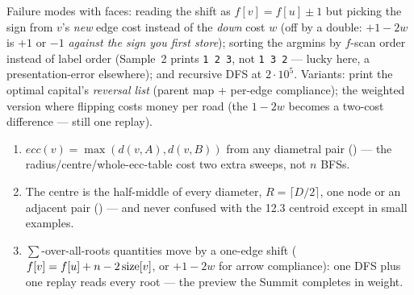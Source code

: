 
\begin{warningbox}
Failure modes with faces: reading the shift as $f[v] = f[u] \pm 1$ but picking the sign
from $v$'s \emph{new} edge cost instead of the \emph{down} cost $w$ (off by a
double: $+1-2w$ is $+1$ or $-1$ \emph{against the sign you first store}); sorting the
argmins by $f$-scan order instead of label order (Sample~2 prints \texttt{1 2 3}, not
\texttt{1 3 2} --- lucky here, a presentation-error elsewhere); and recursive DFS at
$2\cdot 10^5$. Variants: print the optimal capital's \emph{reversal list} (parent map
+ per-edge compliance); the weighted version where flipping costs money per road
(the $1-2w$ becomes a two-cost difference --- still one replay).
\end{warningbox}

\begin{insightbox}
\begin{enumerate}[nosep, leftmargin=1.6em]
  \item $\mathit{ecc}(v) = \max(d(v,A), d(v,B))$ from any diametral pair
        () --- the radius/centre/whole-ecc-table cost two extra
        sweeps, not $n$ BFSs.
  \item The centre is the half-middle of every diameter, $R = \lceil D/2 \rceil$, one
        node or an adjacent pair () --- and never confused with
        the 12.3 centroid except in small examples.
  \item $\sum$-over-all-roots quantities move by a one-edge shift
        ($f[v] = f[u] + n - 2\operatorname{size}[v]$, or $+1-2w$ for arrow compliance): one DFS plus
        one replay reads every root --- the preview the Summit completes in weight.
\end{enumerate}
\end{insightbox}

